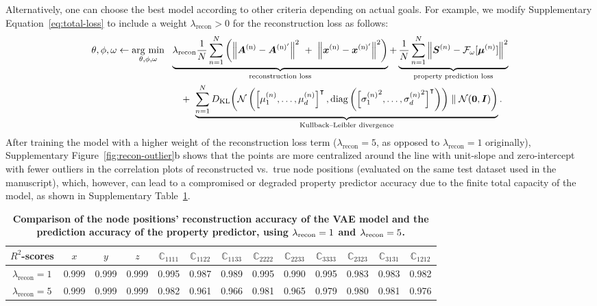 \documentclass[fleqn,10pt]{wlscirep}
\newcommand{\boldface}[1]{\boldsymbol{#1}}
\newcommand{\bfx}{\boldface{x}}
\newcommand{\bfA}{\boldface{A}}
\newcommand{\bfI}{\boldface{I}}
\newcommand{\bfS}{\boldface{S}}
\newcommand{\bfmu}{\boldsymbol{\mu}}
\newcommand{\calF}{\mathcal{F}}
\newcommand{\calN}{\mathcal{N}}
\newcommand{\be}{\begin{equation}}
\newcommand{\ee}{\end{equation}}
\newcommand{\argminWithArgs}{\operatornamewithlimits{arg\ min}}
\begin{document}
Alternatively, one can choose the best model according to other criteria depending on actual goals. For example, we modify Supplementary Equation~\ref{eq:total-loss} to include a weight $\lambda_\text{recon}>0$ for the reconstruction loss as follows:
\be\label{eq:total-loss-modified}
\begin{aligned}
\theta,\phi,\omega \leftarrow \argminWithArgs_{\theta,\phi,\omega} \ \ 
&  
\underbrace{
\lambda_\text{recon}
\frac{1}{N}\sum_{n=1}^N \left(\left\|\bfA^\text{(n)} - \bfA^{\text{(n)}'} \right\|^2  
\ +\  
\left\|\bfx^\text{(n)} - \bfx^{\text{(n)}'} \right\|^2 \right) 
}_\text{reconstruction loss}
 + 
\underbrace{
 \frac{1}{N}\sum_{n=1}^N \left\|\bfS^{(n)} - \calF_\omega[\bfmu^{(n)}] \right\|^2  
 }_\text{property prediction loss}\\
 &
\quad +\ 
\underbrace{
\sum_{n=1}^N D_\text{KL}\bigg(\calN\left(\left[\mu_1^{(n)},\dots,\mu_d^{(n)}\right]^\intercal,\text{diag}\left(\left[{\sigma_1^{(n)}}^2,\dots,{\sigma_d^{(n)}}^2\right]^\intercal\right)\right) \parallel \calN(\boldsymbol{0},\bfI) \bigg)
}_\text{Kullback–Leibler divergence}. \\
\end{aligned}
\ee
After training the model with a higher weight of the reconstruction loss term ($\lambda_{\text{recon}}=5$, as opposed to $\lambda_{\text{recon}}=1$ originally), Supplementary Figure~\ref{fig:recon-outlier}b shows that the points are more centralized around the line with unit-slope and zero-intercept with fewer outliers in the correlation plots of reconstructed vs.~true node positions (evaluated on the same test dataset used in the manuscript), which, however, can lead to a compromised or degraded property predictor accuracy due to the finite total capacity of the model, as shown in Supplementary Table~\ref{tab:modified-loss-score}.


\begin{table}[htb]
\centering
\begin{tabular}{@{}ccccccccccccc@{}}
\toprule
$R^2$-scores      & $x $    & $y$     & $z$     & $\mathbb{C}_{1111}$   & $\mathbb{C}_{1122}$  & $\mathbb{C}_{1133}$   & $\mathbb{C}_{2222}$   & $\mathbb{C}_{2233}$   & $\mathbb{C}_{3333}$   & $\mathbb{C}_{2323}$   & $\mathbb{C}_{3131}$   & $\mathbb{C}_{1212}$   \\ \midrule
$\lambda_{\text{recon}} = 1$ & 0.999 & 0.999 & 0.999 & 0.995 & 0.987 & 0.989 & 0.995 & 0.990 & 0.995 & 0.983 & 0.983 & 0.982 \\
$\lambda_{\text{recon}} = 5$ & 0.999 & 0.999 & 0.999  & 0.982 & 0.961 & 0.966 & 0.981 & 0.965 & 0.979 & 0.980 & 0.981 & 0.976 \\ \bottomrule
\end{tabular}
\caption{\textbf{Comparison of the node positions' reconstruction accuracy of the VAE model and the prediction accuracy of the property predictor, using $\lambda_{\text{\normalfont recon}}=1$ and $\lambda_{\text{\normalfont recon}}=5$.}}
\label{tab:modified-loss-score}
\end{table}
\end{document}
